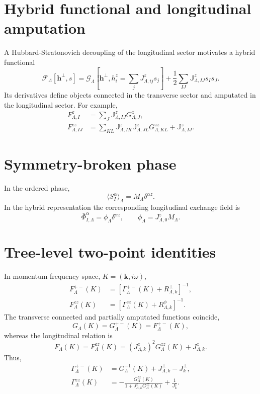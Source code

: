 \documentclass[11pt]{article}
\begin{document}
\section{Hybrid functional and longitudinal amputation}

A Hubbard-Stratonovich decoupling of the longitudinal sector motivates a hybrid functional
\begin{equation}
\mathcal F_\Lambda[\mathbf h^\perp,s]
=\mathcal G_\Lambda\left[\mathbf h^\perp,
 h_i^z=\sum_jJ_{\Lambda,ij}^zs_j\right]
+\frac12\sum_{IJ}\mathbb J^z_{\Lambda,IJ}s_Is_J.
\end{equation}
Its derivatives define objects connected in the transverse sector and amputated in the longitudinal sector. For example,
\begin{align}
F_{\Lambda,I}^{z}&=\sum_J\mathbb J^z_{\Lambda,IJ}G_{\Lambda,J}^{z},\\
F_{\Lambda,IJ}^{zz}
&=\sum_{KL}\mathbb J^z_{\Lambda,IK}\mathbb J^z_{\Lambda,JL}G_{\Lambda,KL}^{zz}
+\mathbb J^z_{\Lambda,IJ}.
\end{align}

\section{Symmetry-broken phase}

In the ordered phase,
\begin{equation}
\langle S_I^\alpha\rangle_\Lambda=M_\Lambda\delta^{\alpha z}.
\end{equation}
In the hybrid representation the corresponding longitudinal exchange field is
\begin{equation}
\bar\Phi_{I,\Lambda}^\alpha=\phi_\Lambda\delta^{\alpha z},
\qquad
\phi_\Lambda=J^z_{\Lambda,0}M_\Lambda.
\end{equation}

\section{Tree-level two-point identities}

In momentum-frequency space, $K=(\mathbf k,i\omega)$,
\begin{align}
F_\Lambda^{+-}(K)&=\left[\Gamma_\Lambda^{+-}(K)+R_{\Lambda,k}^{\perp}\right]^{-1},\\
F_\Lambda^{zz}(K)&=\left[\Gamma_\Lambda^{zz}(K)+R_{\Lambda,k}^{\phi}\right]^{-1}.
\end{align}
The transverse connected and partially amputated functions coincide,
\begin{equation}
G_\Lambda(K)=G_\Lambda^{+-}(K)=F_\Lambda^{+-}(K),
\end{equation}
whereas the longitudinal relation is
\begin{equation}
F_\Lambda(K)=F_\Lambda^{zz}(K)=\left(J^z_{\Lambda,k}\right)^2G_\Lambda^{zz}(K)+J^z_{\Lambda,k}.
\end{equation}
Thus,
\begin{align}
\Gamma_\Lambda^{+-}(K)&=G_\Lambda^{-1}(K)+J_{\Lambda,k}^{\perp}-J_k^{\perp},\\
\Gamma_\Lambda^{zz}(K)
&=-\frac{G_\Lambda^{zz}(K)}{1+J^z_{\Lambda,k}G_\Lambda^{zz}(K)}+\frac{1}{J_k^z}.
\end{align}
\end{document}
